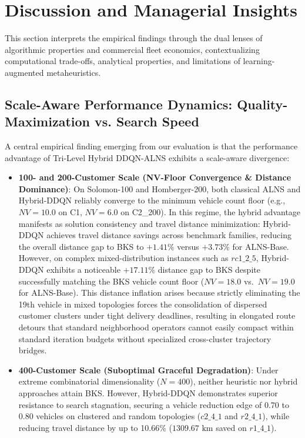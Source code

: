 \section{Discussion and Managerial Insights}
\label{sec:discussion}

This section interprets the empirical findings through the dual lenses of algorithmic properties and commercial fleet economics, contextualizing computational trade-offs, analytical properties, and limitations of learning-augmented metaheuristics.

\subsection{Scale-Aware Performance Dynamics: Quality-Maximization vs. Search Speed}
\label{sec:disc_scale_aware}

A central empirical finding emerging from our evaluation is that the performance advantage of Tri-Level Hybrid DDQN-ALNS exhibits a scale-aware divergence:
\begin{itemize}
    \item \textbf{100- and 200-Customer Scale (NV-Floor Convergence \& Distance Dominance)}: On Solomon-100 and Homberger-200, both classical ALNS and Hybrid-DDQN reliably converge to the minimum vehicle count floor (e.g., $NV=10.0$ on C1, $NV=6.0$ on C2\_200). In this regime, the hybrid advantage manifests as solution consistency and travel distance minimization: Hybrid-DDQN achieves travel distance savings across benchmark families, reducing the overall distance gap to BKS to $+1.41\%$ versus $+3.73\%$ for ALNS-Base. However, on complex mixed-distribution instances such as $rc1\_2\_5$, Hybrid-DDQN exhibits a noticeable $+17.11\%$ distance gap to BKS despite successfully matching the BKS vehicle count floor ($NV=18.0$ vs.\ $NV=19.0$ for ALNS-Base). This distance inflation arises because strictly eliminating the 19th vehicle in mixed topologies forces the consolidation of dispersed customer clusters under tight delivery deadlines, resulting in elongated route detours that standard neighborhood operators cannot easily compact within standard iteration budgets without specialized cross-cluster trajectory bridges.
    \item \textbf{400-Customer Scale (Suboptimal Graceful Degradation)}: Under extreme combinatorial dimensionality ($N=400$), neither heuristic nor hybrid approaches attain BKS. However, Hybrid-DDQN demonstrates superior resistance to search stagnation, securing a vehicle reduction edge of 0.70 to 0.80 vehicles on clustered and random topologies ($c2\_4\_1$ and $r2\_4\_1$), while reducing travel distance by up to 10.66\% ($1309.67\text{ km}$ saved on $r1\_4\_1$).
\end{itemize}

